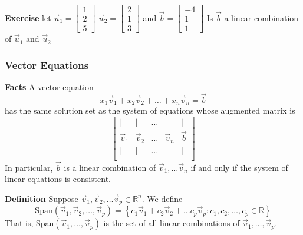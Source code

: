   \begin{frame}[fragile]
\textbf{Exercise}
let 
$\vec{u}_1 = \left[\begin{array}{r} 1 \\ 2 \\ 5 \end{array}\right]$
$\vec{u}_2 = \left[\begin{array}{r} 2 \\ 1 \\ 3 \end{array}\right]$ and 
$\vec{b} = \left[\begin{array}{r} -4 \\ 1 \\ 1 \end{array}\right]$
Is $\vec{b}$ a linear combination of $\vec{u}_1$ and $\vec{u}_2$

\end{frame}

  \begin{frame}[fragile]\frametitle{Vector Equations}
\textbf{Facts}
A vector equation 
\[
 x_1 \vec{v}_1  + x_2 \vec{v}_2 + \dots + x_n \vec{v}_n =\vec{b}
\]
has the same solution set as the system of equations whose augmented matrix is 
\[
 \left[\begin{array}{ccccc}
  | & | & \dots & | & | \\
  \vec{v}_1 & \vec{v}_2 & \dots & \vec{v}_n & \vec{b} \\
  | & | & \dots & | & | \\
 \end{array}\right]
\]
In particular, $\vec{b}$ is a linear combination of $\vec{v}_1, \dots \vec{v}_n$
if and only if the system of linear equations is consistent.

\end{frame}

  \begin{frame}[fragile]
\textbf{Definition}
 Suppose $\vec{v}_1, \vec{v}_2, \dots \vec{v}_p \in \mathbb R^n$.
 We define 
 \[
  \mbox{Span}(\vec{v}_1, \vec{v}_2, \dots ,\vec{v}_p) =
 \left\{
 c_1 \vec{v}_1 + c_2 \vec{v}_2 + \dots c_p \vec{v}_p: c_1, c_2, \dots , c_p \in \mathbb R 
 \right\}
 \]    
 That is, Span$(\vec{v}_1, \dots , \vec{v}_p)$ is the set of all linear combinations
of $\vec{v}_1, \dots , \vec{v}_p$.

\end{frame}

